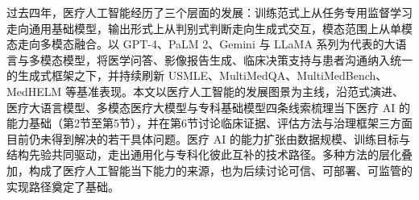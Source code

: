 过去四年，医疗人工智能经历了三个层面的发展：训练范式上从任务专用监督学习走向通用基础模型，输出形式上从判别式判断走向生成式交互，模态范围上从单模态走向多模态融合。以 GPT-4、PaLM 2、Gemini 与 LLaMA 系列为代表的大语言与多模态模型，将医学问答、影像报告生成、临床决策支持与患者沟通纳入统一的生成式框架之下，并持续刷新 USMLE、MultiMedQA、MultiMedBench、MedHELM 等基准表现。本文以医疗人工智能的发展图景为主线，沿范式演进、医疗大语言模型、多模态医疗大模型与专科基础模型四条线索梳理当下医疗 AI 的能力基础（第2节至第5节），并在第6节讨论临床证据、评估方法与治理框架三方面目前仍未得到解决的若干具体问题。医疗 AI 的能力扩张由数据规模、训练目标与结构先验共同驱动，走出通用化与专科化彼此互补的技术路径。多种方法的层化叠加，构成了医疗人工智能当下能力的来源，也为后续讨论可信、可部署、可监管的实现路径奠定了基础。

